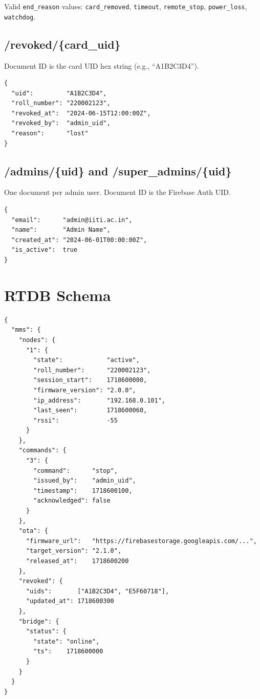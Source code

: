 Valid \texttt{end\_reason} values: \texttt{card\_removed}, \texttt{timeout}, \texttt{remote\_stop}, \texttt{power\_loss}, \texttt{watchdog}.

\subsection{/revoked/\{card\_uid\}}

Document ID is the card UID hex string (e.g., ``A1B2C3D4'').

\begin{lstlisting}[style=jsonlstyle,caption={/revoked/A1B2C3D4}]
{
  "uid":         "A1B2C3D4",
  "roll_number": "220002123",
  "revoked_at":  "2024-06-15T12:00:00Z",
  "revoked_by":  "admin_uid",
  "reason":      "lost"
}
\end{lstlisting}

\subsection{/admins/\{uid\} and /super\_admins/\{uid\}}

One document per admin user. Document ID is the Firebase Auth UID.

\begin{lstlisting}[style=jsonlstyle,caption={/admins/firebase-auth-uid}]
{
  "email":      "admin@iiti.ac.in",
  "name":       "Admin Name",
  "created_at": "2024-06-01T00:00:00Z",
  "is_active":  true
}
\end{lstlisting}

\section{RTDB Schema}

\begin{lstlisting}[style=jsonlstyle,caption={Full RTDB structure}]
{
  "mms": {
    "nodes": {
      "1": {
        "state":            "active",
        "roll_number":      "220002123",
        "session_start":    1718600000,
        "firmware_version": "2.0.0",
        "ip_address":       "192.168.0.101",
        "last_seen":        1718600060,
        "rssi":             -55
      }
    },
    "commands": {
      "3": {
        "command":      "stop",
        "issued_by":    "admin_uid",
        "timestamp":    1718600100,
        "acknowledged": false
      }
    },
    "ota": {
      "firmware_url":   "https://firebasestorage.googleapis.com/...",
      "target_version": "2.1.0",
      "released_at":    1718600200
    },
    "revoked": {
      "uids":       ["A1B2C3D4", "E5F60718"],
      "updated_at": 1718600300
    },
    "bridge": {
      "status": {
        "state": "online",
        "ts":    1718600000
      }
    }
  }
}
\end{lstlisting}

